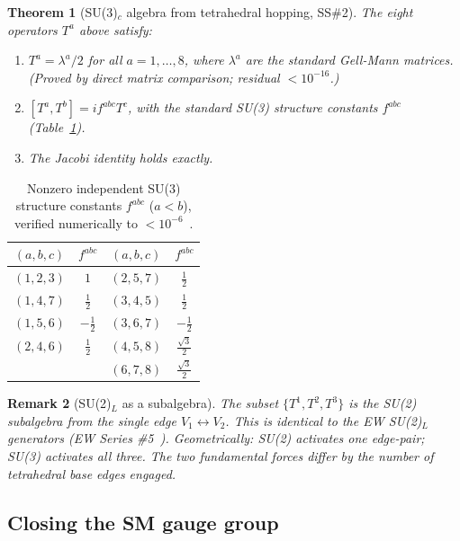 \documentclass[11pt,letterpaper]{article}
\newtheorem{theorem}{Theorem}[section]
\newtheorem{remark}[theorem]{Remark}
\begin{document}
\begin{theorem}[SU(3)$_c$ algebra from tetrahedral hopping, SS\#2]
\label{thm:su3}
The eight operators $T^a$ above satisfy:
\begin{enumerate}
\item $T^a = \lambda^a/2$ for all $a = 1,\ldots,8$, where
  $\lambda^a$ are the standard Gell-Mann matrices.
  (Proved by direct matrix comparison; residual $< 10^{-16}$.)
\item $[T^a, T^b] = if^{abc}T^c$, with the standard SU(3)
  structure constants $f^{abc}$ (Table~\ref{tab:fconst}).
\item The Jacobi identity holds exactly.
\end{enumerate}
\end{theorem}

\begin{table}[H]
\centering
\caption{Nonzero independent SU(3) structure constants $f^{abc}$
  ($a<b$), verified numerically to $<10^{-6}$~\citep{cpp_ss_mc}.}
\label{tab:fconst}
\begin{tabular}{@{}cccc@{}}
\toprule
$(a,b,c)$ & $f^{abc}$ & $(a,b,c)$ & $f^{abc}$ \\
\midrule
$(1,2,3)$ & $1$ & $(2,5,7)$ & $\tfrac{1}{2}$ \\
$(1,4,7)$ & $\tfrac{1}{2}$ & $(3,4,5)$ & $\tfrac{1}{2}$ \\
$(1,5,6)$ & $-\tfrac{1}{2}$ & $(3,6,7)$ & $-\tfrac{1}{2}$ \\
$(2,4,6)$ & $\tfrac{1}{2}$ & $(4,5,8)$ & $\tfrac{\sqrt{3}}{2}$ \\
& & $(6,7,8)$ & $\tfrac{\sqrt{3}}{2}$ \\
\bottomrule
\end{tabular}
\end{table}

\begin{remark}[SU(2)$_L$ as a subalgebra]
The subset $\{T^1,T^2,T^3\}$ is the SU(2) subalgebra from the
single edge $V_1\leftrightarrow V_2$.  This is identical to the
EW SU(2)$_L$ generators (EW Series \#5~\citep{cpp_ew5}).
Geometrically: SU(2) activates one edge-pair; SU(3) activates all
three.  The two fundamental forces differ by the number of
tetrahedral base edges engaged.
\end{remark}

\subsection{Closing the SM gauge group}
\end{document}
